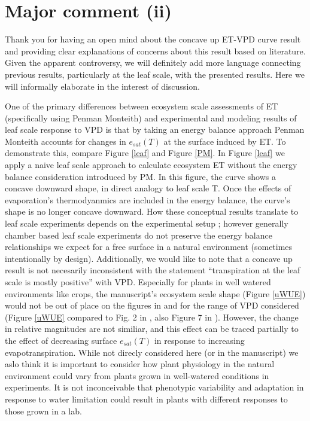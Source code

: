 \documentclass[12pt]{article}
\begin{document}
\section{Major comment (ii)}

Thank you for having an open mind about the concave up ET-VPD curve
result and providing clear explanations of concerns about this result
based on literature. Given the apparent controversy, we will
definitely add more language connecting previous results, particularly
at the leaf scale, with the presented results. Here we will informally
elaborate in the interest of discussion.

One of the primary differences between ecosystem scale assessments of
ET (specifically using Penman Monteith) and experimental and modeling
results of leaf scale response to VPD is that by taking an energy
balance approach Penman Monteith accounts for changes in $e_{sat}(T)$
at the surface induced by ET. To demonstrate this, compare Figure
\ref{leaf} and Figure \ref{PM}. In Figure \ref{leaf} we apply a naive
leaf scale approach to calculate ecosystem ET without the energy
balance consideration introduced by PM. In this figure, the curve
shows a concave downward shape, in direct analogy to leaf scale
T. Once the effects of evaporation's thermodyanmics are included in
the energy balance, the curve's shape is no longer concave
downward. How these conceptual results translate to leaf scale
experiments depends on the experimental setup
\citep[e.g.,]{Rawson1988, Turner1984, Mott2013}; however generally
chamber based leaf scale experiments do not preserve the energy
balance relationships we expect for a free surface in a natural
environment (sometimes intentionally by design). Additionally, we
would like to note that a concave up result is not necesarily
inconsistent with the statement ``transpiration at the leaf scale is
mostly positive'' with VPD. Especially for plants in well watered
environments like crops, the manuscript's ecosystem scale shape
(Figure \ref{uWUE}) would not be out of place on the figures in
\cite{Rawson1977} and \cite{Mott2007} for the range of VPD considered
(Figure \ref{uWUE} compared to Fig. 2 in \cite{Rawson1977}, also
Figure 7 in \cite{Mott2007}). However, the change in relative
magnitudes are not similiar, and this effect can be traced partially
to the effect of decreasing surface $e_{sat}(T)$ in response to
increasing evapotranspiration. While not direcly considered here (or
in the manuscript) we aslo think it is important to consider how plant
physiology in the natural environment could vary from plants grown in
well-watered conditions in experiments. It is not inconceivable that
phenotypic variability and adaptation in response to water limitation
could result in plants with different responses to those grown in a
lab.
\end{document}

